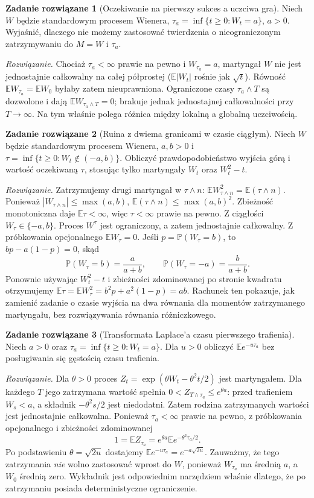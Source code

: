 \documentclass[11pt,a4paper,oneside]{report}
\numberwithin{equation}{chapter}
\theoremstyle{plain}
\theoremstyle{definition}
\newtheorem{zadanie}{Zadanie rozwiązane}[chapter]
\theoremstyle{remark}
\newcommand{\Prob}{\mathbb{P}}
\newcommand{\E}{\mathbb{E}}
\begin{document}
\begin{zadanie}[Oczekiwanie na pierwszy sukces a uczciwa gra]
Niech $W$ będzie standardowym procesem Wienera,
$\tau_a=\inf\{t\ge0:W_t=a\}$, $a>0$. Wyjaśnić,
dlaczego nie możemy zastosować twierdzenia o
nieograniczonym zatrzymywaniu do $M=W$ i $\tau_a$.

\emph{Rozwiązanie.} Chociaż $\tau_a<\infty$ prawie
na pewno i $W_{\tau_a}=a$, martyngał $W$ nie jest
jednostajnie całkowalny na całej półprostej
($\E|W_t|$ rośnie jak $\sqrt t$).
Równość $\E W_{\tau_a}=\E W_0$ byłaby zatem
nieuprawniona. Ograniczone czasy $\tau_a\wedge T$
są dozwolone i dają $\E W_{\tau_a\wedge T}=0$;
brakuje jednak jednostajnej całkowalności przy
$T\to\infty$. Na tym właśnie polega różnica
między lokalną a globalną uczciwością.
\end{zadanie}

\begin{zadanie}[Ruina z dwiema granicami w czasie ciągłym]
Niech $W$ będzie standardowym procesem Wienera,
$a,b>0$ i
$\tau=\inf\{t\ge0:W_t\notin(-a,b)\}$.
Obliczyć prawdopodobieństwo wyjścia górą i wartość
oczekiwaną $\tau$, stosując tylko martyngały
$W_t$ oraz $W_t^2-t$.

\emph{Rozwiązanie.} Zatrzymujemy drugi martyngał w
$\tau\wedge n$:
$\E W_{\tau\wedge n}^2=\E(\tau\wedge n)$.
Ponieważ $|W_{\tau\wedge n}|\le\max(a,b)$,
$\E(\tau\wedge n)\le\max(a,b)^2$.
Zbieżność monotoniczna daje $\E\tau<\infty$, więc
$\tau<\infty$ prawie na pewno. Z ciągłości
$W_\tau\in\{-a,b\}$.
Proces $W^\tau$ jest ograniczony, a zatem
jednostajnie całkowalny. Z próbkowania opcjonalnego
$\E W_\tau=0$. Jeśli $p=\Prob(W_\tau=b)$, to
$bp-a(1-p)=0$, skąd
\[
\Prob(W_\tau=b)=\frac{a}{a+b},\qquad
\Prob(W_\tau=-a)=\frac{b}{a+b}.
\]
Ponownie używając $W_t^2-t$ i zbieżności zdominowanej
po stronie kwadratu otrzymujemy
$\E\tau=\E W_\tau^2=b^2p+a^2(1-p)=ab$.
Rachunek ten pokazuje, jak zamienić zadanie o czasie
wyjścia na dwa równania dla momentów zatrzymanego
martyngału, bez rozwiązywania równania różniczkowego.
\end{zadanie}

\begin{zadanie}[Transformata Laplace'a czasu pierwszego trafienia]
Niech $a>0$ oraz
$\tau_a=\inf\{t\ge0:W_t=a\}$. Dla $u>0$
obliczyć $\E e^{-u\tau_a}$ bez posługiwania się
gęstością czasu trafienia.

\emph{Rozwiązanie.} Dla $\theta>0$ proces
$Z_t=\exp(\theta W_t-\theta^2t/2)$ jest
martyngałem. Dla każdego $T$ jego zatrzymana
wartość spełnia $0<Z_{T\wedge\tau_a}\le e^{\theta a}$:
przed trafieniem $W_s<a$, a składnik
$-\theta^2s/2$ jest niedodatni. Zatem rodzina
zatrzymanych wartości jest jednostajnie całkowalna.
Ponieważ $\tau_a<\infty$ prawie na pewno,
z próbkowania opcjonalnego i zbieżności zdominowanej
\[
1=\E Z_{\tau_a}
=e^{\theta a}\E e^{-\theta^2\tau_a/2}.
\]
Po podstawieniu $\theta=\sqrt{2u}$ dostajemy
$\E e^{-u\tau_a}=e^{-a\sqrt{2u}}$.
Zauważmy, że tego zatrzymania \emph{nie} wolno
zastosować wprost do $W$, ponieważ $W_{\tau_a}$
ma średnią $a$, a $W_0$ średnią zero. Wykładnik
jest odpowiednim narzędziem właśnie dlatego, że
po zatrzymaniu posiada deterministyczne ograniczenie.
\end{zadanie}
\end{document}
